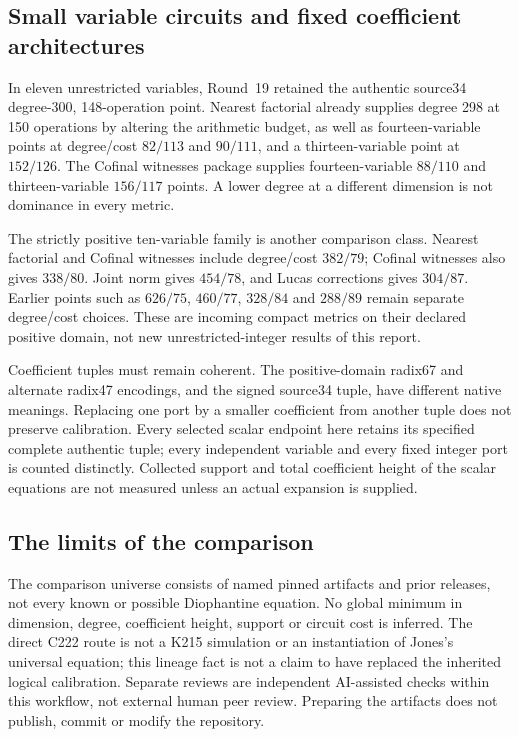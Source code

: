 \subsection{Small variable circuits and fixed coefficient architectures}
In eleven unrestricted variables, Round~19 retained the authentic
source34 degree-300, 148-operation point. Nearest factorial already
supplies degree 298 at 150 operations by altering the arithmetic budget,
as well as fourteen-variable points at degree/cost $82/113$ and $90/111$,
and a thirteen-variable point at $152/126$. The Cofinal witnesses
package supplies fourteen-variable $88/110$ and thirteen-variable
$156/117$ points. A lower degree at a different dimension is not
dominance in every metric.

The strictly positive ten-variable family is another comparison class.
Nearest factorial and Cofinal witnesses include degree/cost $382/79$;
Cofinal witnesses also gives $338/80$. Joint norm gives $454/78$,
and Lucas corrections gives $304/87$. Earlier points such as $626/75$,
$460/77$, $328/84$ and $288/89$ remain separate degree/cost choices.
These are incoming compact metrics on their declared positive domain,
not new unrestricted-integer results of this report.

Coefficient tuples must remain coherent. The positive-domain radix67
and alternate radix47 encodings, and the signed source34 tuple, have
different native meanings. Replacing one port by a smaller coefficient
from another tuple does not preserve calibration. Every selected scalar
endpoint here retains its specified complete authentic tuple; every
independent variable and every fixed integer port is counted distinctly.
Collected support and total coefficient height of the scalar equations
are not measured unless an actual expansion is supplied.

\subsection{The limits of the comparison}
The comparison universe consists of named pinned artifacts and prior
releases, not every known or possible Diophantine equation. No global
minimum in dimension, degree, coefficient height, support or circuit cost
is inferred. The direct C222 route is not a K215 simulation or an
instantiation of Jones's universal equation; this lineage fact is not a
claim to have replaced the inherited logical calibration. Separate reviews
are independent AI-assisted checks within this workflow, not external
human peer review. Preparing the artifacts does not publish, commit or
modify the repository.
